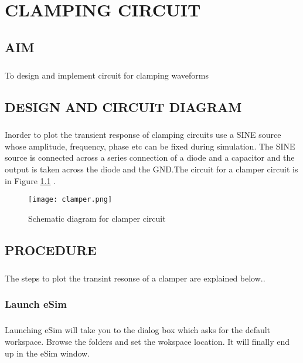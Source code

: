 \chapter{CLAMPING CIRCUIT}

\section*{AIM}
\paragraph{}To design and implement circuit for clamping waveforms
\section*{DESIGN AND CIRCUIT DIAGRAM}
\paragraph{}

Inorder to plot the transient response of clamping circuits use a SINE source whose amplitude, frequency, phase etc can be fixed during simulation. The SINE source is connected across a series connection of a diode and a capacitor and the output is taken across  the diode and the GND.The circuit for a clamper circuit is in Figure  \ref{clamper} .

\begin{figure}[h]
\centering
\texttt{[image: clamper.png]}
\caption{Schematic diagram for clamper circuit}
\label{clamper}
\end{figure}


\section*{PROCEDURE}

\paragraph{}The steps to plot the transint resonse of a clamper are explained below.. 
\subsection*{Launch eSim}

\paragraph{}
 Launching eSim will take you to the dialog box which asks for the default workspace. Browse the folders and set the wokspace location. It will finally end up in the eSim window.%

